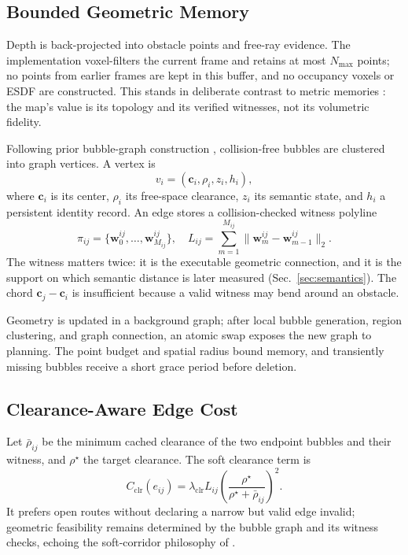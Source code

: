 \documentclass[letterpaper,10pt,conference]{ieeeconf}
\newcommand{\vect}[1]{\boldsymbol{#1}}
\begin{document}
\subsection{Bounded Geometric Memory}
Depth is back-projected into obstacle points and free-ray evidence.  The
implementation voxel-filters the current frame and retains at most
$N_{\max}$ points; no points from earlier frames are kept in this buffer, and
no occupancy voxels or ESDF are constructed.  This stands in deliberate
contrast to metric memories \cite{octomap,voxblox}: the map's value is its
topology and its verified witnesses, not its volumetric fidelity.

Following prior bubble-graph construction \cite{epic,bubble}, collision-free
bubbles are clustered into graph vertices.  A vertex is
\begin{equation}
 v_i=(\vect{c}_i,\rho_i,z_i,h_i),
\end{equation}
where $\vect{c}_i$ is its center, $\rho_i$ its free-space clearance, $z_i$
its semantic state, and $h_i$ a persistent identity record.  An edge stores a
collision-checked witness polyline
\begin{equation}
 \pi_{ij}=\{\vect{w}^{ij}_0,\ldots,\vect{w}^{ij}_{M_{ij}}\},
 \quad
 L_{ij}=\sum_{m=1}^{M_{ij}}
 \|\vect{w}^{ij}_m-\vect{w}^{ij}_{m-1}\|_2.
\end{equation}
The witness matters twice: it is the executable geometric connection, and it
is the support on which semantic distance is later measured
(Sec.~\ref{sec:semantics}).  The chord $\vect{c}_j-\vect{c}_i$ is
insufficient because a valid witness may bend around an obstacle.

Geometry is updated in a background graph; after local bubble generation,
region clustering, and graph connection, an atomic swap exposes the new graph
to planning.  The point budget and spatial radius bound memory, and
transiently missing bubbles receive a short grace period before deletion.

\subsection{Clearance-Aware Edge Cost}
Let $\bar\rho_{ij}$ be the minimum cached clearance of the two endpoint
bubbles and their witness, and $\rho^\star$ the target clearance.  The soft
clearance term is
\begin{equation}
 C_{\mathrm{clr}}(e_{ij})=
 \lambda_{\mathrm{clr}}L_{ij}
 \left(\frac{\rho^\star}{\rho^\star+\bar\rho_{ij}}\right)^2.
\label{eq:clearance}
\end{equation}
It prefers open routes without declaring a narrow but valid edge invalid;
geometric feasibility remains determined by the bubble graph and its witness
checks, echoing the soft-corridor philosophy of \cite{bubble,gcopter}.
\end{document}
